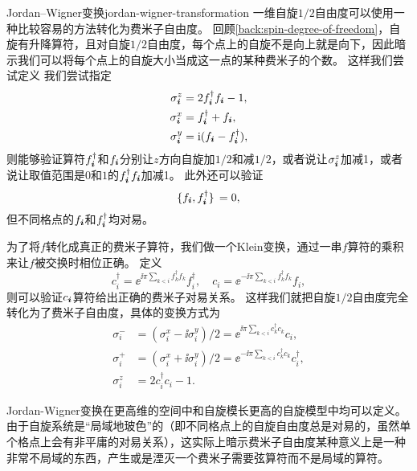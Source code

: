 \begin{back}{Jordan–Wigner变换}{jordan-wigner-transformation}
    一维自旋$1/2$自由度可以使用一种比较容易的方法转化为费米子自由度。
    回顾\autoref{back:spin-degree-of-freedom}，自旋有升降算符，且对自旋$1/2$自由度，每个点上的自旋不是向上就是向下，因此暗示我们可以将每个点上的自旋大小当成这一点的某种费米子的个数。
    这样我们尝试定义
    我们尝试指定
    \begin{equation}
        \begin{aligned}
            {\sigma}^z_{\vb*{i}} &= 2 {f}^\dagger_{\vb*{i}} {f}_{\vb*{i}} - 1, \\
            {\sigma}^x_{\vb*{i}} &= {f}^\dagger_{\vb*{i}} + {f}_{\vb*{i}}, \\
            {\sigma}^y_{\vb*{i}} &= \mathrm{i} ({f}_{\vb*{i}} - {f}^\dagger_{\vb*{i}}),
        \end{aligned}
    \end{equation}
    则能够验证算符$f_{\vb*{i}}^\dagger$和$f_{\vb*{i}}$分别让$z$方向自旋加$1/2$和减$1/2$，或者说让$\sigma^z_{\vb*{i}}$加减1，或者说让取值范围是$0$和$1$的$f^\dagger_{\vb*{i}} f_{\vb*{i}}$加减1。
    此外还可以验证
    \begin{equation}
        \acomm*{f_{\vb*{i}}}{f^\dagger_{\vb*{i}}} = 0, 
    \end{equation}
    但不同格点的$f_{\vb*{i}}$和$f^\dagger_{\vb*{i}}$均对易。

    为了将$f$转化成真正的费米子算符，我们做一个Klein变换，通过一串$f$算符的乘积来让$f$被交换时相位正确。
    定义
    \begin{equation}
        {c}^\dagger_i = \ee^{\ii \pi \sum_{k < i} {f}_k^\dagger {f}_k} {f}^\dagger_i, \quad {c}_i = \ee^{- \ii \pi \sum_{k < i} {f}_k^\dagger {f}_k} {f}_i,
    \end{equation}
    则可以验证$c_{\vb*{i}}$算符给出正确的费米子对易关系。
    这样我们就把自旋$1/2$自由度完全转化为了费米子自由度，具体的变换方式为
    \begin{equation}
        \begin{aligned}
            \sigma^-_i &= (\sigma^x_i - \ii \sigma_i^y) / 2 = \ee^{\ii \pi \sum_{k < i} c^\dagger_k c_k} c_i, \\
            \sigma^+_i &= (\sigma^x_i + \ii \sigma_i^y) / 2 = \ee^{- \ii \pi \sum_{k < i} c^\dagger_k c_k} c^\dagger_i, \\
            \sigma_i^z &= 2 c^\dagger_i c_i - 1.
        \end{aligned}
    \end{equation}

    Jordan-Wigner变换在更高维的空间中\cite{Shaofeng1995}和自旋模长更高的自旋模型中\cite{Batista_2001}均可以定义。
    由于自旋系统是“局域地玻色”的（即不同格点上的自旋自由度总是对易的，虽然单个格点上会有非平庸的对易关系），这实际上暗示费米子自由度某种意义上是一种非常不局域的东西，产生或是湮灭一个费米子需要弦算符而不是局域的算符。   
\end{back}

